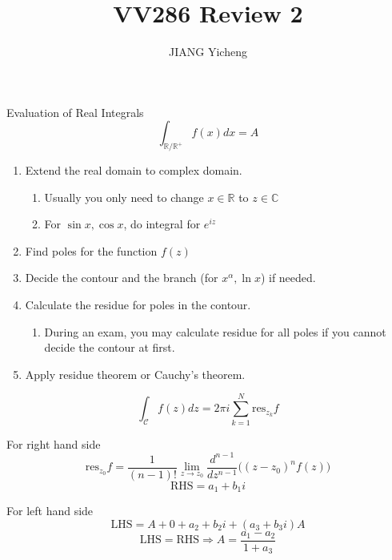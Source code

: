 \documentclass{beamer}
\title{\textcolor[rgb]{0,0.168,0.376}{VV286 Review 2}}
\author{JIANG Yicheng}
\begin{document}
\begin{frame}
\titlepage
\end{frame}

\begin{frame}
\begin{block}{Evaluation of Real Integrals}
$$\int_{\mathbb{R}/\mathbb{R}^+}f(x)dx=A$$
\begin{enumerate}
\item Extend the real domain to complex domain.
\begin{enumerate}
\item Usually you only need to change $x\in \mathbb{R}$ to $z\in\mathbb{C}$
\item For $\sin x, \cos x$, do integral for $e^{iz}$
\end{enumerate} 
\item Find poles for the function $f(z)$


\item Decide the contour and the branch (for $x^{\alpha},\ln x$) if needed.
\item Calculate the residue for poles in the contour.
\begin{enumerate}
\item During an exam, you may calculate residue for all poles if you cannot decide the contour at first.
\end{enumerate}
\item Apply residue theorem or Cauchy's theorem.
\end{enumerate}
\end{block}
\end{frame}

\begin{frame}
$$\int_{\mathcal{C}}f(z)dz=2\pi i\sum\limits_{k=1}^N\text{res}_{z_k}f$$
\begin{block}{For right hand side}
$$\text{res}_{z_0}f=\dfrac{1}{(n-1)!}\lim_{z\rightarrow z_0}\dfrac{d^{n-1}}{dz^{n-1}}\big((z-z_0)^nf(z)\big)$$
$$\text{RHS}=a_1+b_1i$$
\end{block}
\begin{block}{For left hand side}
$$\text{LHS}=A+0+a_2+b_2i+(a_3+b_3i)A$$
$$\text{LHS}=\text{RHS}\Rightarrow A=\dfrac{a_1-a_2}{1+a_3}$$
\end{block}
\end{frame}
\end{document}

